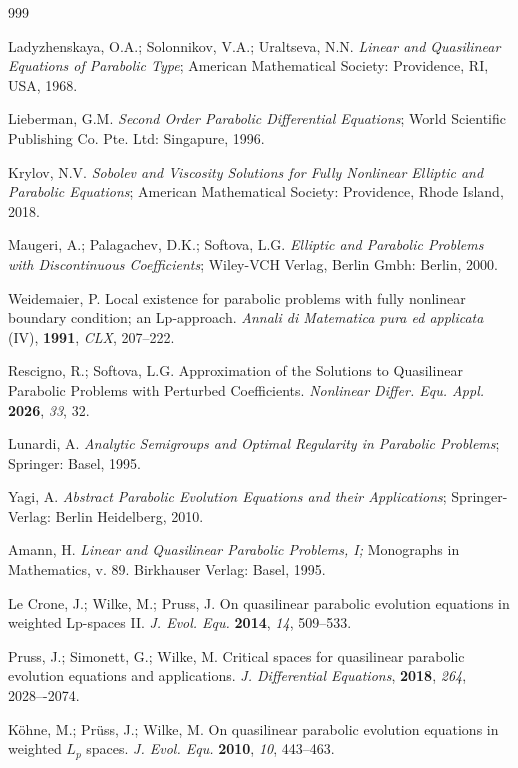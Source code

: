 \documentclass{article}
\theoremstyle{plain}
\begin{document}
\begin{thebibliography}{999}

  Ladyzhenskaya, O.A.; Solonnikov, V.A.;   Uraltseva, N.N. {\it Linear and Quasilinear Equations of
    Parabolic Type}; American Mathematical Society: Providence, RI, USA,  1968.

 Lieberman, G.M. {\it Second Order Parabolic Differential Equations}; World Scientific Publishing Co. Pte. Ltd: Singapure,  1996.

 Krylov, N.V. {\it Sobolev and Viscosity Solutions for Fully Nonlinear Elliptic and Parabolic Equations};  American Mathematical Society: Providence, Rhode Island, 2018.

 Maugeri, A.; Palagachev, D.K.; Softova, L.G.  {\it Elliptic and Parabolic Problems with Discontinuous Coefficients}; Wiley-VCH Verlag, Berlin Gmbh: Berlin, 2000.  

Weidemaier, P.  Local existence for parabolic problems
with fully nonlinear boundary condition; an Lp-approach. {\it Annali di Matematica pura ed applicata} 
(IV), {\bf 1991}, {\it CLX},  207--222.

Rescigno, R.; Softova, L.G. Approximation of the Solutions to Quasilinear Parabolic Problems with Perturbed 
 Coefficients. {\it Nonlinear Differ. Equ. Appl.} {\bf 2026}, {\it 33}, 32. 

Lunardi, A. {\it Analytic Semigroups
and Optimal Regularity
in Parabolic Problems}; Springer: Basel, 1995.

  Yagi, A.
{\it Abstract Parabolic Evolution Equations and their Applications}; Springer-Verlag: Berlin Heidelberg, 2010.  

  Amann, H. {\it Linear and Quasilinear Parabolic
    Problems, I;} Monographs in Mathematics, v. 89.   Birkhauser Verlag: Basel,  1995.

 Le Crone, J.; Wilke,  M.;  Pruss, J. On quasilinear parabolic evolution equations in
weighted Lp-spaces II.  {\it J. Evol. Equ.} {\bf 2014}, {\it 14}, 509–533.

Pruss,  J.;  Simonett, G.;   Wilke, M. Critical spaces for quasilinear parabolic evolution equations and applications. {\it J. Differential Equations}, {\bf 2018}, {\it 264},  2028–-2074.

 K\"{o}hne, M.;  Pr\"{u}ss, J.; Wilke, M.  On quasilinear parabolic evolution equations in weighted $L_p$ spaces. {\it J. Evol. Equ.} {\bf 2010}, {\it 10}, 443--463.


\end{thebibliography}
\end{document}
